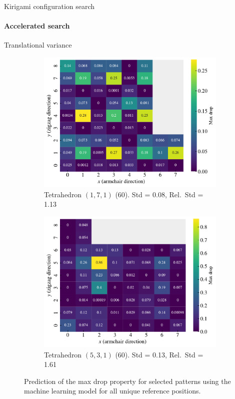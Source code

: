 \documentclass[
	10pt, %
]{beamer}
\begin{document}
\begin{frame}{Kirigami configuration search}
	\framesubtitle{Accelerated search}
	Translational variance
	\begin{figure}[H]
		\centering
		\begin{subfigure}[t]{0.49\textwidth}
			\centering
			\includegraphics[width=\textwidth]{../thesis/figures/search/ref_search_drop_pop_1_7_1_ref_search.pdf}
			\caption{Tetrahedron $(1,7,1)$ (60). Std = 0.08, Rel.\ Std = 1.13}
			\label{fig:tetra_171_trans}
		\end{subfigure}
		\hfill
		\begin{subfigure}[t]{0.49\textwidth}
			\centering
			\includegraphics[width=\textwidth]{../thesis/figures/search/ref_search_drop_pop_5_3_1_ref_search.pdf}
			\caption{Tetrahedron $(5,3,1)$ (60). Std = 0.13, Rel.\ Std = 1.61}
		\end{subfigure}
		\caption{Prediction of the max drop property for selected patterns using the machine learning model for all unique reference positions.}
	\end{figure}
\end{frame}
\end{document}
